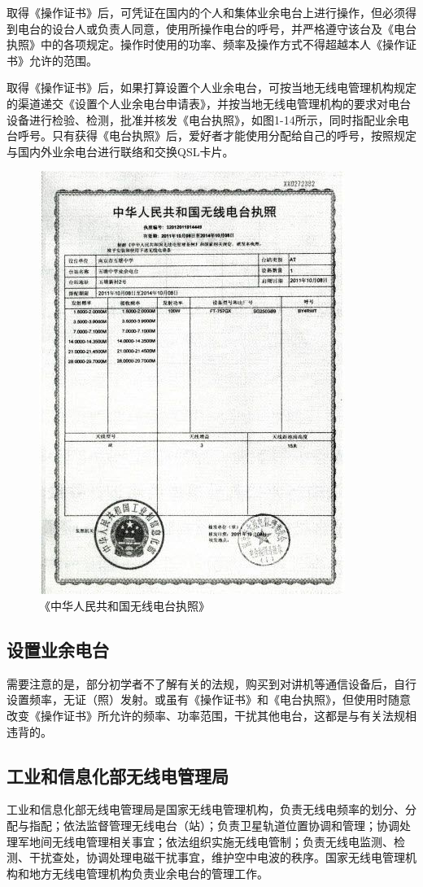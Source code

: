 \documentclass[12pt,UTF8]{ctexbook}
\begin{document}
取得《操作证书》后，可凭证在国内的个人和集体业余电台上进行操作，但必须得到电台的设台人或负责人同意，使用所操作电台的呼号，并严格遵守该台及《电台执照》中的各项规定。操作时使用的功率、频率及操作方式不得超越本人《操作证书》允许的范围。

取得《操作证书》后，如果打算设置个人业余电台，可按当地无线电管理机构规定的渠道递交《设置个人业余电台申请表》，并按当地无线电管理机构的要求对电台设备进行检验、检测，批准并核发《电台执照》，如图1-14所示，同时指配业余电台呼号。只有获得《电台执照》后，爱好者才能使用分配给自己的呼号，按照规定与国内外业余电台进行联络和交换QSL卡片。

\begin{figure}[htbp]
	\centering
	\includegraphics[width=0.7\linewidth]{14}
	\caption{《中华人民共和国无线电台执照》}
	\label{fig:1}
\end{figure}

\subsection{设置业余电台}

需要注意的是，部分初学者不了解有关的法规，购买到对讲机等通信设备后，自行设置频率，无证（照）发射。或虽有《操作证书》和《电台执照》，但使用时随意改变《操作证书》所允许的频率、功率范围，干扰其他电台，这都是与有关法规相违背的。

\subsection{工业和信息化部无线电管理局}
工业和信息化部无线电管理局是国家无线电管理机构，负责无线电频率的划分、分配与指配；依法监督管理无线电台（站）；负责卫星轨道位置协调和管理；协调处理军地间无线电管理相关事宜；依法组织实施无线电管制；负责无线电监测、检测、干扰查处，协调处理电磁干扰事宜，维护空中电波的秩序。国家无线电管理机构和地方无线电管理机构负责业余电台的管理工作。
\end{document}
